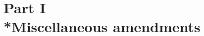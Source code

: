 \documentclass[12pt,a4paper]{article}
\begin{document}
\section[Part I --- Miscellaneous amendments]{Part I\\*Miscellaneous amendments}

\renewcommand\parthead{--- Schedule 5 Part I}

%
%
%
%
%
%
%
%
%
%
%
%
%
%
\end{document}
